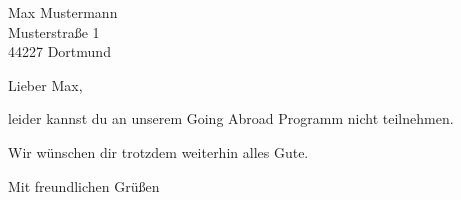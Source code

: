 \documentclass[
  pepbrief,
  fontsize=12pt,
  paper=a4,
  DIV=14,
  parskip=half,
  backaddress=false,
]{scrlttr2}
\author{Henning Moldenhauer}
\begin{document}
\begin{letter}{%
  Max Mustermann\\
  Musterstraße 1\\
  44227 Dortmund%
}
\opening{Lieber Max,}

leider kannst du an unserem Going Abroad Programm nicht teilnehmen.

Wir wünschen dir trotzdem weiterhin alles Gute.

\closing{Mit freundlichen Grüßen}

\end{letter}
\end{document}
